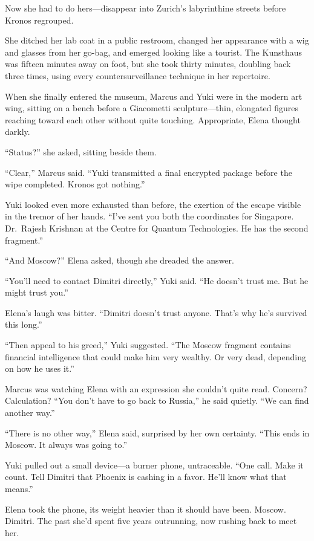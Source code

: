 \documentclass[12pt,letterpaper]{book}
\begin{document}
Now she had to do hers---disappear into Zurich's labyrinthine streets before Kronos regrouped.

She ditched her lab coat in a public restroom, changed her appearance with a wig and glasses from her go-bag, and emerged looking like a tourist. The Kunsthaus was fifteen minutes away on foot, but she took thirty minutes, doubling back three times, using every countersurveillance technique in her repertoire.

When she finally entered the museum, Marcus and Yuki were in the modern art wing, sitting on a bench before a Giacometti sculpture---thin, elongated figures reaching toward each other without quite touching. Appropriate, Elena thought darkly.

``Status?'' she asked, sitting beside them.

``Clear,'' Marcus said. ``Yuki transmitted a final encrypted package before the wipe completed. Kronos got nothing.''

Yuki looked even more exhausted than before, the exertion of the escape visible in the tremor of her hands. ``I've sent you both the coordinates for Singapore. Dr.~Rajesh Krishnan at the Centre for Quantum Technologies. He has the second fragment.''

``And Moscow?'' Elena asked, though she dreaded the answer.

``You'll need to contact Dimitri directly,'' Yuki said. ``He doesn't trust me. But he might trust you.''

Elena's laugh was bitter. ``Dimitri doesn't trust anyone. That's why he's survived this long.''

``Then appeal to his greed,'' Yuki suggested. ``The Moscow fragment contains financial intelligence that could make him very wealthy. Or very dead, depending on how he uses it.''

Marcus was watching Elena with an expression she couldn't quite read. Concern? Calculation? ``You don't have to go back to Russia,'' he said quietly. ``We can find another way.''

``There is no other way,'' Elena said, surprised by her own certainty. ``This ends in Moscow. It always was going to.''

Yuki pulled out a small device---a burner phone, untraceable. ``One call. Make it count. Tell Dimitri that Phoenix is cashing in a favor. He'll know what that means.''

Elena took the phone, its weight heavier than it should have been. Moscow. Dimitri. The past she'd spent five years outrunning, now rushing back to meet her.
\end{document}
